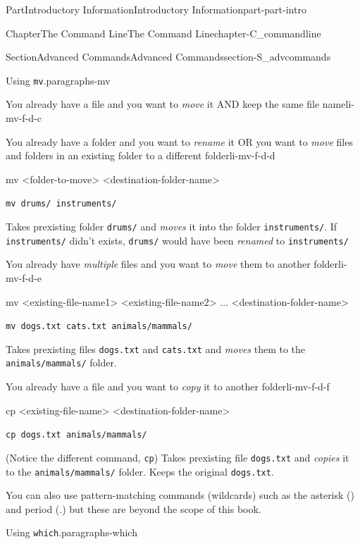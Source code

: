 \documentclass[oneside,10pt,]{book}
\newcommand{\mono}[1]{\texttt{#1}}
\begin{document}
\begin{partptx}{Part}{Introductory Information}{}{Introductory Information}{}{}{part-part-intro}
\begin{chapterptx}{Chapter}{The Command Line}{}{The Command Line}{}{}{chapter-C_commandline}
\begin{sectionptx}{Section}{Advanced Commands}{}{Advanced Commands}{}{}{section-S_advcommands}
\begin{paragraphs}{Using \mono{mv}.}{paragraphs-mv}
\begin{descriptionlist}
\begin{dlinarrow}{You already have a file and you want to \emph{move} it AND keep the same file name}{li-mv-f-d-c}
\end{dlinarrow}%
\begin{dlinarrow}{You already have a folder and you want to \emph{rename} it OR you want to \emph{move} files and folders in an existing folder to a different folder}{li-mv-f-d-d}%
%
\begin{codedisplay}
mv <folder-to-move> <destination-folder-name>
\end{codedisplay}
%
\par
\mono{mv drums/ instruments/}%
\par
Takes prexisting folder \mono{drums/} and \emph{moves} it into the folder \mono{instruments/}. If \mono{instruments/} didn't exists, \mono{drums/} would have been \emph{renamed} to \mono{instruments/}%
\end{dlinarrow}%
\begin{dlinarrow}{You already have \emph{multiple} files and you want to \emph{move} them to another folder}{li-mv-f-d-e}%
%
\begin{codedisplay}
mv <existing-file-name1> <existing-file-name2> ...
	<destination-folder-name>
\end{codedisplay}
%
\par
\mono{mv dogs.txt cats.txt animals/mammals/}%
\par
Takes prexisting files \mono{dogs.txt} and \mono{cats.txt} and \emph{moves} them to the \mono{animals/mammals/} folder.%
\end{dlinarrow}%
\begin{dlinarrow}{You already have a file and you want to \emph{copy} it to another folder}{li-mv-f-d-f}%
%
\begin{codedisplay}
cp <existing-file-name> <destination-folder-name>
\end{codedisplay}
%
\par
\mono{cp dogs.txt animals/mammals/}%
\par
(Notice the different command, \mono{cp}) Takes prexisting file \mono{dogs.txt} and \emph{copies} it to the \mono{animals/mammals/} folder. Keeps the original \mono{dogs.txt}.%
\end{dlinarrow}%
\end{descriptionlist}
%
\par
You can also use pattern-matching commands (wildcards) such as the asterisk (\textasteriskcentered{}) and period (.) but these are beyond the scope of this book.%
\end{paragraphs}%
\begin{paragraphs}{Using \mono{which}.}{paragraphs-which}%

\end{paragraphs}
\end{sectionptx}
\end{chapterptx}
\end{partptx}
\end{document}
